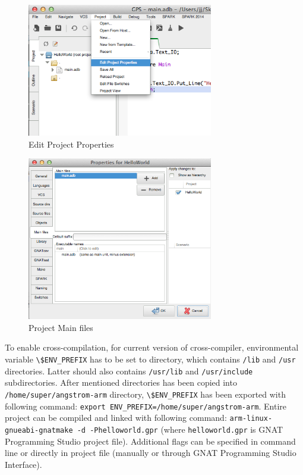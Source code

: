 \begin{figure}[ht]%
    \begin{center}
    	\includegraphics[width=3.2in]{figures/EditProjectProperties.png}
    	\caption{Edit Project Properties}
    \end{center}
    \label{figure:editprojectproperties}
\end{figure}

\begin{figure}[ht]%
    \begin{center}
    	\includegraphics[width=3.2in]{figures/Properties-MainFiles.png}
    	\caption{Project Main files}
    \end{center}
    \label{figure:mainfiles}
\end{figure}

To enable cross-compilation, for current version of cross-compiler, environmental variable \lstinline{\$ENV_PREFIX} has to be set to directory, which contains \lstinline{/lib} and \lstinline{/usr} directories. Latter should also contains \lstinline{/usr/lib} and \lstinline{/usr/include} subdirectories. After mentioned directories has been copied into \lstinline{/home/super/angstrom-arm} directory, \lstinline{\$ENV_PREFIX} has been exported with following command: \lstinline{export ENV_PREFIX=/home/super/angstrom-arm}. Entire project can be compiled and linked with following command: \lstinline{arm-linux-gnueabi-gnatmake -d -Phelloworld.gpr} (where \lstinline{helloworld.gpr} is GNAT Programming Studio project file). Additional flags can be specified in command line or directly in project file (manually or through GNAT Programming Studio Interface).


